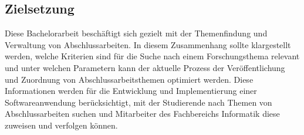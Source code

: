 \newpage
\subsection{Zielsetzung}
Diese Bachelorarbeit beschäftigt sich gezielt mit der Themenfindung und Verwaltung von Abschlussarbeiten. In diesem Zusammenhang sollte klargestellt werden, welche Kriterien sind für die Suche nach einem Forschungsthema relevant und unter welchen Parametern kann der aktuelle Prozess der Veröffentlichung und Zuordnung von Abschlussarbeitsthemen optimiert werden. Diese Informationen werden für die Entwicklung und Implementierung einer Softwareanwendung berücksichtigt, mit der Studierende nach Themen von Abschlussarbeiten suchen und Mitarbeiter des Fachbereichs Informatik diese zuweisen und verfolgen können.
